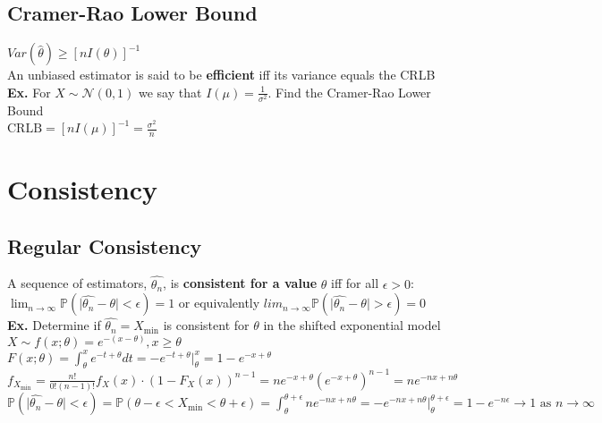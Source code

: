 \documentclass{article}
\begin{document}
\subsection{Cramer-Rao Lower Bound}
$Var(\hat\theta)\geq[nI(\theta)]^{-1}$\\
An unbiased estimator is said to be \textbf{efficient} iff its variance equals the CRLB\\
\textbf{Ex.} For $X\sim\mathcal{N}(0,1)$ we say that $I(\mu)=\frac{1}{\sigma^2}$. Find the Cramer-Rao Lower Bound\\
$\text{CRLB}=[nI(\mu)]^{-1}=\frac{\sigma^2}{n}$
\section{Consistency}
\label{sec:consistency}
\subsection{Regular Consistency}
A sequence of estimators, $\hat{\theta_n}$, is \textbf{consistent for a value} $\theta$ iff for all $\epsilon>0$:\\
\hspace*{0.25in}$\lim_{n\rightarrow\infty}\mathbb{P}(\vert\hat{\theta_n}-\theta\vert<\epsilon)=1$ or equivalently $lim_{n\rightarrow\infty}\mathbb{P}(\vert\hat{\theta_n}-\theta\vert>\epsilon)=0$\\
\textbf{Ex.} Determine if $\hat{\theta_n}=X_{\text{min}}$ is consistent for $\theta$ in the shifted exponential model\\ $X\sim f(x;\theta)=e^{-(x-\theta)},x\geq \theta$\\
$F(x;\theta)=\int_\theta^xe^{-t+\theta}dt=-e^{-t+\theta}\big\vert_\theta^x=1-e^{-x+\theta}$\\
$f_{X_\text{min}}=\frac{n!}{0!(n-1)!}f_X(x)\cdot(1-F_X(x))^{n-1}=ne^{-x+\theta}(e^{-x+\theta})^{n-1}=ne^{-nx+n\theta}$\\
$\mathbb{P}(\vert\hat{\theta_n}-\theta\vert<\epsilon)=\mathbb{P}(\theta-\epsilon<X_{\text{min}}<\theta+\epsilon)=\int_\theta^{\theta+\epsilon}ne^{-nx+n\theta}=-e^{-nx+n\theta}\big\vert_\theta^{\theta+\epsilon}=1-e^{-n\epsilon}\rightarrow1\text{ as }n\rightarrow\infty$
\end{document}
